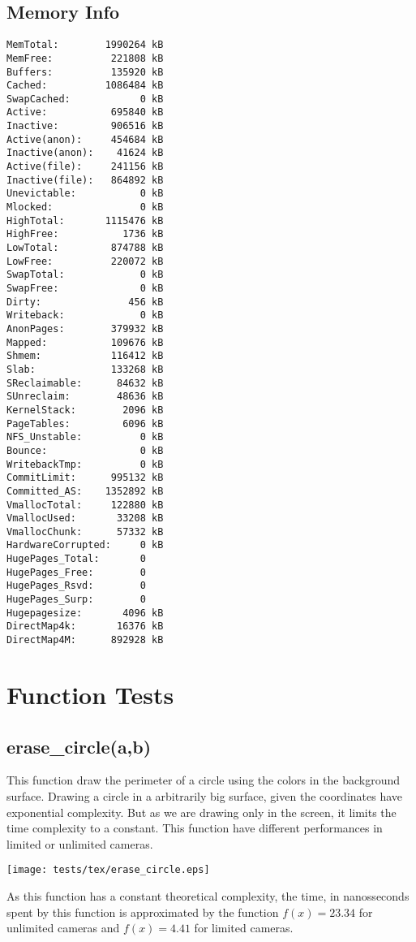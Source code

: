 \documentclass{article}
\begin{document}
\subsection{Memory Info}
\begin{verbatim}
MemTotal:        1990264 kB
MemFree:          221808 kB
Buffers:          135920 kB
Cached:          1086484 kB
SwapCached:            0 kB
Active:           695840 kB
Inactive:         906516 kB
Active(anon):     454684 kB
Inactive(anon):    41624 kB
Active(file):     241156 kB
Inactive(file):   864892 kB
Unevictable:           0 kB
Mlocked:               0 kB
HighTotal:       1115476 kB
HighFree:           1736 kB
LowTotal:         874788 kB
LowFree:          220072 kB
SwapTotal:             0 kB
SwapFree:              0 kB
Dirty:               456 kB
Writeback:             0 kB
AnonPages:        379932 kB
Mapped:           109676 kB
Shmem:            116412 kB
Slab:             133268 kB
SReclaimable:      84632 kB
SUnreclaim:        48636 kB
KernelStack:        2096 kB
PageTables:         6096 kB
NFS_Unstable:          0 kB
Bounce:                0 kB
WritebackTmp:          0 kB
CommitLimit:      995132 kB
Committed_AS:    1352892 kB
VmallocTotal:     122880 kB
VmallocUsed:       33208 kB
VmallocChunk:      57332 kB
HardwareCorrupted:     0 kB
HugePages_Total:       0
HugePages_Free:        0
HugePages_Rsvd:        0
HugePages_Surp:        0
Hugepagesize:       4096 kB
DirectMap4k:       16376 kB
DirectMap4M:      892928 kB
\end{verbatim}
\section{Function Tests}
\subsection{erase\_circle(a,b)}
This function draw the perimeter of a circle using
the colors in the background surface. Drawing a
circle in a arbitrarily big surface, given the
coordinates have exponential complexity. But as
we are drawing only in the screen, it limits 
the time complexity to a constant. This function
have different performances in limited or unlimited
cameras.

\texttt{[image: tests/tex/erase\_circle.eps]}

As this function has a constant
theoretical complexity, the time, in nanosseconds
spent by this function is 
approximated by the function $f(x)=23.34$
for unlimited cameras and $f(x)=4.41$ for
limited cameras.
\end{document}
